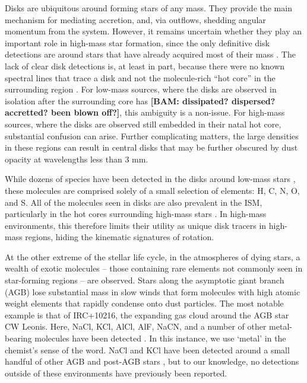 \documentclass[12pt]{article}
\newcommand{\bam}[1]{\textcolor{green!65!black}{\textbf{[BAM: #1]}}}
\begin{document}
Disks are ubiquitous around forming stars of any mass.  They provide the main mechanism for
mediating accretion, and, via outflows, shedding angular momentum from the system.
However, it remains uncertain whether they play an important role in high-mass
star formation, since the only definitive disk detections are around stars that
have already acquired most of their mass \cite{Girart2017a,Ginsburg2018b}.
The lack of clear disk detections is, at least in part, because there were no
known spectral lines that trace a disk and not the molecule-rich ``hot core''
in the surrounding region \cite{Goddi2018a,Cesaroni2017a}.  For low-mass sources, where the disks are observed in isolation after the surrounding core has \bam{dissipated?  dispersed?  accretted?  been blown off?}, this ambiguity is a non-issue.  For high-mass sources, where the disks are observed still embedded in their natal hot core, substantial confusion can arise.  Further complicating matters, the large densities in these regions can result in central disks
that may be further obscured by dust opacity at wavelengths less than 3 mm.


While dozens of species have been detected in the disks around low-mass stars
\cite{McGuire2018c}, these molecules are comprised solely of a small selection
of elements: H, C, N, O, and S.  All of the molecules seen in disks are also
prevalent in the ISM, particularly in the hot cores surrounding high-mass stars
\cite{some sgr b2 reference}. In high-mass environments, this therefore
limits their utility as unique disk tracers in high-mass regions, hiding
the kinematic signatures of rotation.

At the other extreme of the stellar life cycle, in the atmospheres of dying
stars, a wealth of exotic molecules -- those containing rare elements not
commonly seen in star-forming regions -- are observed.  Stars along the
asymptotic giant branch (AGB) lose substantial mass in slow winds
\cite{Herwig2005a} that form molecules with high atomic weight elements that
rapidly condense onto dust particles.  The most notable example is that of
IRC+10216, the expanding gas cloud around the AGB star CW Leonis.  Here, NaCl,
KCl, AlCl, AlF, NaCN, and a number of other metal-bearing molecules have been
detected \cite{Agundez2012a,Zack2011a}.  In this instance, we use `metal' in
the chemist's sense of the word.  NaCl and KCl have been detected around a small handful of other
AGB and post-AGB stars
\cite{Milam2007a,Highberger2003a,Sanchez-Contreras2018a}, but to our
knowledge, no detections outside of these environments have previously been
reported.
\end{document}
